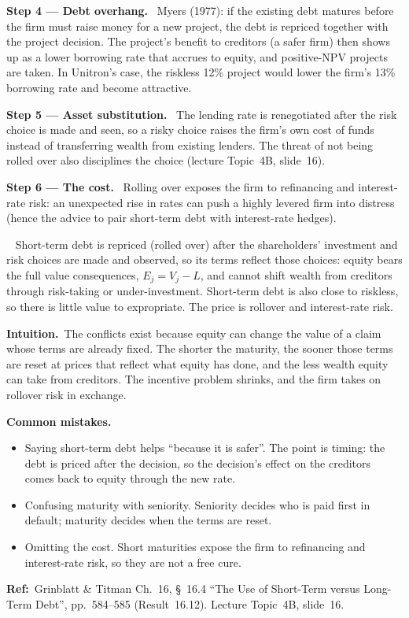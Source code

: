\documentclass[11pt,a4paper]{article}
\newcommand{\step}[2]{\par\medskip\noindent\textbf{Step #1 --- #2.}~}
\newcommand{\intuition}{\par\medskip\noindent\textbf{Intuition.}~}
\newcommand{\refbib}{\par\smallskip\noindent\textbf{Ref:}~}
\newcommand{\answer}[1]{\par\smallskip\noindent\fbox{\textbf{Answer #1.}}~}
\newcommand{\pitfalls}{\par\medskip\noindent\textbf{Common mistakes.}}
\begin{document}
\step{4}{Debt overhang} Myers (1977): if the existing debt matures before the firm must raise
money for a new project, the debt is repriced together with the project decision. The
project's benefit to creditors (a safer firm) then shows up as a lower borrowing rate that
accrues to equity, and positive-NPV projects are taken. In Unitron's case, the riskless
12\% project would lower the firm's 13\% borrowing rate and become attractive.

\step{5}{Asset substitution} The lending rate is renegotiated after the risk choice is made and
seen, so a risky choice raises the firm's own cost of funds instead of transferring wealth
from existing lenders. The threat of not being rolled over also disciplines the choice (lecture
Topic~4B, slide~16).

\step{6}{The cost} Rolling over exposes the firm to refinancing and interest-rate risk: an
unexpected rise in rates can push a highly levered firm into distress (hence the advice to
pair short-term debt with interest-rate hedges).

\answer{(16.11)} Short-term debt is repriced (rolled over) after the shareholders' investment and
risk choices are made and observed, so its terms reflect those choices: equity bears the full value
consequences, $E_j=V_j-L$, and cannot shift wealth from creditors through risk-taking or
under-investment. Short-term debt is also close to riskless, so there is little value to
expropriate. The price is rollover and interest-rate risk.

\intuition The conflicts exist because equity can change the value of a claim whose terms are
already fixed. The shorter the maturity, the sooner those terms are reset at prices that
reflect what equity has done, and the less wealth equity can take from creditors. The
incentive problem shrinks, and the firm takes on rollover risk in exchange.
\pitfalls
\begin{itemize}
  \item Saying short-term debt helps ``because it is safer''. The point is timing: the debt is priced
        after the decision, so the decision's effect on the creditors comes back to equity through the
        new rate.
  \item Confusing maturity with seniority. Seniority decides who is paid first in default; maturity
        decides when the terms are reset.
  \item Omitting the cost. Short maturities expose the firm to refinancing and interest-rate risk, so
        they are not a free cure.
\end{itemize}
\refbib{Grinblatt \& Titman Ch.~16, \S~16.4 ``The Use of Short-Term versus Long-Term Debt'', pp.~584--585 (Result~16.12). Lecture Topic~4B, slide~16.}
\end{document}
